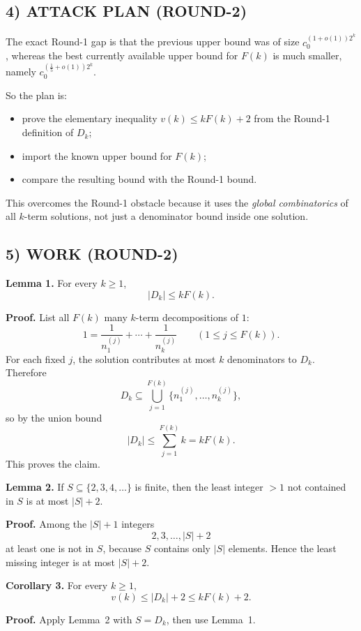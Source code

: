 \subsection*{4) ATTACK PLAN (ROUND-2)}

The exact Round-1 gap is that the previous upper bound was of size $c_0^{(1+o(1))2^k}$, whereas the best currently available upper bound for $F(k)$ is much smaller, namely $c_0^{(\frac15+o(1))2^k}$.

So the plan is:
\begin{itemize}
\item prove the elementary inequality $v(k)\le kF(k)+2$ from the Round-1 definition of $D_k$;
\item import the known upper bound for $F(k)$;
\item compare the resulting bound with the Round-1 bound.
\end{itemize}

This overcomes the Round-1 obstacle because it uses the \emph{global combinatorics} of all $k$-term solutions, not just a denominator bound inside one solution.

\subsection*{5) WORK (ROUND-2)}

\medskip
\noindent\textbf{Lemma 1.}
For every $k\ge 1$,
\[
|D_k|\le kF(k).
\]

\medskip
\noindent\textbf{Proof.}
List all $F(k)$ many $k$-term decompositions of $1$:
\[
1=\frac1{n_1^{(j)}}+\cdots+\frac1{n_k^{(j)}}
\qquad (1\le j\le F(k)).
\]
For each fixed $j$, the solution contributes at most $k$ denominators to $D_k$. Therefore
\[
D_k\subseteq \bigcup_{j=1}^{F(k)} \{n_1^{(j)},\ldots,n_k^{(j)}\},
\]
so by the union bound
\[
|D_k|\le \sum_{j=1}^{F(k)} k = kF(k).
\]
This proves the claim.

\medskip
\noindent\textbf{Lemma 2.}
If $S\subseteq \{2,3,4,\ldots\}$ is finite, then the least integer $>1$ not contained in $S$ is at most $|S|+2$.

\medskip
\noindent\textbf{Proof.}
Among the $|S|+1$ integers
\[
2,3,\ldots,|S|+2
\]
at least one is not in $S$, because $S$ contains only $|S|$ elements. Hence the least missing integer is at most $|S|+2$.

\medskip
\noindent\textbf{Corollary 3.}
For every $k\ge 1$,
\[
v(k)\le |D_k|+2\le kF(k)+2.
\]

\medskip
\noindent\textbf{Proof.}
Apply Lemma~2 with $S=D_k$, then use Lemma~1.

